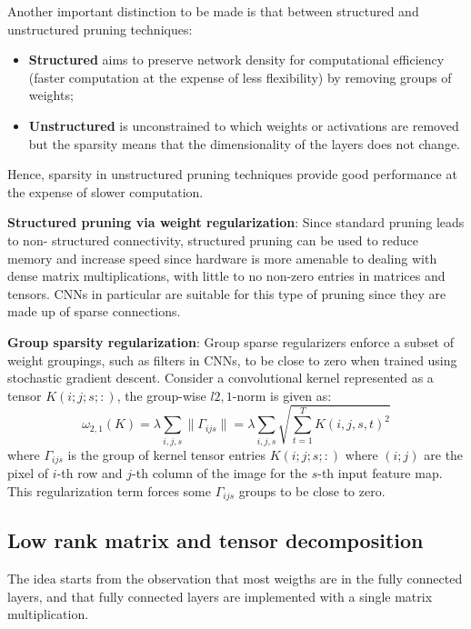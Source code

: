 Another important distinction to be made is that between structured and unstructured
pruning techniques:
\begin{itemize}
    \item \textbf{Structured} aims to preserve network density for computational efficiency
          (faster computation at the expense of less flexibility) by removing groups of weights;
    \item \textbf{Unstructured} is unconstrained to which weights or activations are removed
          but the sparsity means that the dimensionality of the layers does not change.
\end{itemize}
Hence, sparsity in unstructured pruning techniques provide good performance at the expense
of slower computation.

\textbf{Structured pruning via weight regularization}: Since standard pruning leads to non-
structured connectivity, structured pruning can be used to reduce memory and increase speed since
hardware is more amenable to dealing with dense matrix multiplications, with little to no non-zero
entries in matrices and tensors. CNNs in particular are suitable for this type of pruning since
they are made up of sparse connections.

\textbf{Group sparsity regularization}: Group sparse regularizers enforce a subset of weight
groupings, such as filters in CNNs, to be close to zero when trained using stochastic gradient
descent. Consider a convolutional kernel represented as a tensor $K(i; j; s; :)$, the group-wise
$l2, 1$-norm is given as:
\begin{equation*}
    \omega_{2, 1} (K) = \lambda \sum_{i, j, s} \| \Gamma_{ijs}\| = \lambda \sum_{i, j, s} \sqrt{\sum_{t= 1}^T K(i, j, s, t)^2}
\end{equation*}
where $\Gamma_{ijs}$ is the group of kernel tensor entries $K(i; j; s; :)$ where $(i; j)$ are the
pixel of $i$-th row and $j$-th column of the image for the $s$-th input feature map. This
regularization term forces some $\Gamma_{ijs}$ groups to be close to zero.

\subsection{Low rank matrix and tensor decomposition}
The idea starts from the observation that most weigths are in the fully connected layers, and that
fully connected layers are implemented with a single matrix multiplication.
